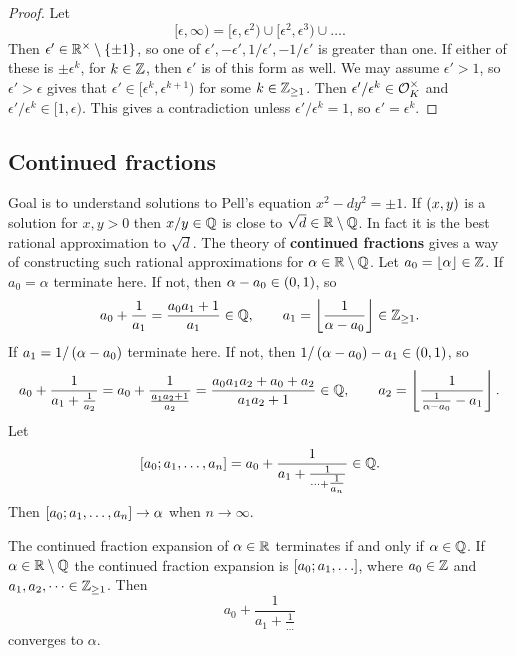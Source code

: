 \begin{proof}
Let
$$ [\epsilon, \infty) = [\epsilon, \epsilon^2) \cup [\epsilon^2, \epsilon^3) \cup \dots. $$
Then $ \epsilon' \in \R^\times \setminus \cb{\pm 1} $, so one of $ \epsilon', -\epsilon', 1 / \epsilon', -1 / \epsilon' $ is greater than one. If either of these is $ \pm\epsilon^k $, for $ k \in \Z $, then $ \epsilon' $ is of this form as well. We may assume $ \epsilon' > 1 $, so $ \epsilon' > \epsilon $ gives that $ \epsilon' \in [\epsilon^k, \epsilon^{k + 1}) $ for some $ k \in \Z_{\ge 1} $. Then $ \epsilon' / \epsilon^k \in \OO_K^\times $ and $ \epsilon' / \epsilon^k \in [1, \epsilon) $. This gives a contradiction unless $ \epsilon' / \epsilon^k = 1 $, so $ \epsilon' = \epsilon^k $.
\end{proof}

\subsection{Continued fractions}

Goal is to understand solutions to Pell's equation $ x^2 - dy^2 = \pm 1 $. If $ \rb{x, y} $ is a solution for $ x, y > 0 $ then $ x / y \in \Q $ is close to $ \sqrt{d} \in \R \setminus \Q $. In fact it is the best rational approximation to $ \sqrt{d} $. The theory of \textbf{continued fractions} gives a way of constructing such rational approximations for $ \alpha \in \R \setminus \Q $. Let $ a_0 = \fb{\alpha} \in \Z $. If $ a_0 = \alpha $ terminate here. If not, then $ \alpha - a_0 \in \rb{0, 1} $, so
$$ a_0 + \dfrac{1}{a_1} = \dfrac{a_0a_1 + 1}{a_1} \in \Q, \qquad a_1 = \fb{\dfrac{1}{\alpha - a_0}} \in \Z_{\ge 1}. $$
If $ a_1 = 1 / \rb{\alpha - a_0} $ terminate here. If not, then $ 1 / \rb{\alpha - a_0} - a_1 \in \rb{0, 1} $, so
$$ a_0 + \dfrac{1}{a_1 + \tfrac{1}{a_2}} = a_0 + \dfrac{1}{\tfrac{a_1a_2 + 1}{a_2}} = \dfrac{a_0a_1a_2 + a_0 + a_2}{a_1a_2 + 1} \in \Q, \qquad a_2 = \fb{\dfrac{1}{\tfrac{1}{\alpha - a_0} - a_1}}. $$
Let
$$ \sb{a_0; a_1, \dots, a_n} = a_0 + \dfrac{1}{a_1 + \tfrac{1}{\dots + \tfrac{1}{a_n}}} \in \Q. $$
Then $ \sb{a_0; a_1, \dots, a_n} \to \alpha $ when $ n \to \infty $.

\begin{lemma}
The continued fraction expansion of $ \alpha \in \R $ terminates if and only if $ \alpha \in \Q $. If $ \alpha \in \R \setminus \Q $ the continued fraction expansion is $ \sb{a_0; a_1, \dots} $, where $ a_0 \in \Z $ and $ a_1, a_2, \dots \in \Z_{\ge 1} $. Then
$$ a_0 + \dfrac{1}{a_1 + \tfrac{1}{\dots}} $$
converges to $ \alpha $.
\end{lemma}

